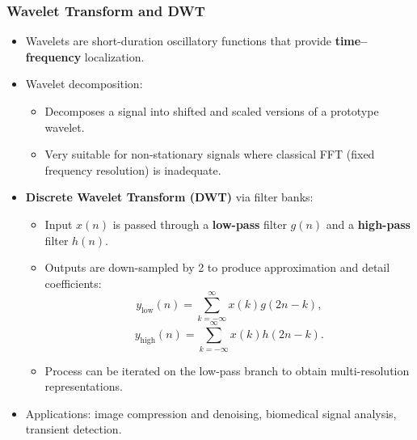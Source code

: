 \begin{frame}
	\frametitle{Wavelet Transform and DWT}
	\begin{itemize}
		\item Wavelets are short-duration oscillatory functions that provide \textbf{time–frequency} localization.
		\item Wavelet decomposition:
		\begin{itemize}
			\item Decomposes a signal into shifted and scaled versions of a prototype wavelet.
			\item Very suitable for non-stationary signals where classical FFT (fixed frequency resolution) is inadequate.
		\end{itemize}
		\item \textbf{Discrete Wavelet Transform (DWT)} via filter banks:
		\begin{itemize}
			\item Input $x(n)$ is passed through a \textbf{low-pass} filter $g(n)$ and a \textbf{high-pass} filter $h(n)$.
			\item Outputs are down-sampled by 2 to produce approximation and detail coefficients:
			\begin{equation}
				y_{\text{low}}(n) = \sum_{k=-\infty}^{\infty} x(k) g(2n-k),
			\end{equation}
			\begin{equation}
				y_{\text{high}}(n) = \sum_{k=-\infty}^{\infty} x(k) h(2n-k).
			\end{equation}
			\item Process can be iterated on the low-pass branch to obtain multi-resolution representations.
		\end{itemize}
		\item Applications: image compression and denoising, biomedical signal analysis, transient detection.
	\end{itemize}
\end{frame}

